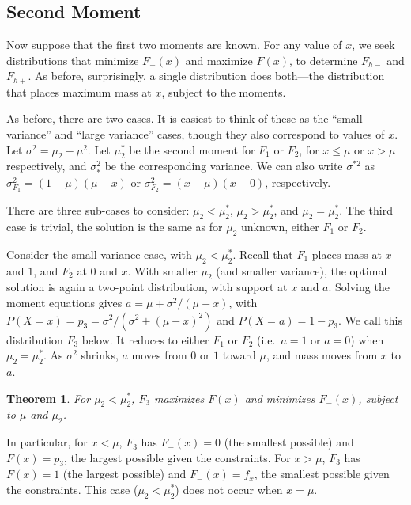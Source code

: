 \documentclass{article}
\newcommand{\Fmin}{F_{h-}}
\newcommand{\Fmax}{F_{h+}}
\newtheorem{theorem}{Theorem}
\begin{document}
\subsection{Second Moment}

Now suppose that the first two moments are known.
For any value of $x$, we seek distributions that minimize
$F_{-}(x)$ and maximize $F(x)$, to determine $\Fmin$ and $\Fmax$.
As before, surprisingly, a single distribution
does both---the distribution that places maximum mass at $x$, subject
to the moments.

As before, there are two cases. It is easiest to
think of these as the ``small variance'' and ``large variance'' cases,
though they also correspond to values of $x$.
Let $\sigma^2 = \mu_2 - \mu^2$.
Let $\mu_2^*$ be the second moment for $F_1$ or $F_2$, for
$x \le \mu$ or $x > \mu$ respectively, and
$\sigma_*^2$ be the corresponding variance.
We can also write $\sigma^{*2}$ as
$\sigma_{F_1}^2 = (1-\mu)(\mu-x)$
or
$\sigma_{F_2}^2 = (x-\mu)(x - 0)$, respectively.


There are three sub-cases to consider:
$\mu_2 < \mu_2^*$,
$\mu_2 > \mu_2^*$, and
$\mu_2 = \mu_2^*$.
The third case is trivial, the solution is the same as for $\mu_2$ unknown,
either $F_1$ or $F_2$.

Consider the small variance case, with $\mu_2 < \mu_2^*$.
Recall that $F_1$ places mass at $x$ and $1$,
and $F_2$ at $0$ and $x$.
With smaller $\mu_2$ (and smaller variance), the optimal solution
is again a two-point distribution,
with support at $x$ and $a$.
Solving the moment equations gives
$a = \mu + \sigma^2/(\mu-x)$,
with $P(X = x) = p_3 = \sigma^2 / (\sigma^2 + (\mu-x)^2)$ and
$P(X = a) = 1-p_3$.
We call this distribution $F_3$ below.
It reduces to either $F_1$ or $F_2$
(i.e.\ $a=1$ or $a=0$) when $\mu_2 = \mu_2^*$.
As $\sigma^2$ shrinks, $a$ moves from $0$ or $1$ toward $\mu$,
and mass moves from $x$ to $a$.

\begin{theorem}
For $\mu_2 < \mu_2^*$,
$F_3$ maximizes $F(x)$ and minimizes $F_{-}(x)$, subject to $\mu$
and $\mu_2$.
\end{theorem}

In particular,
for $x < \mu$, $F_3$
has $F_{-}(x) = 0$ (the smallest possible) and
$F(x) = p_3$, the largest possible given the constraints.
For $x > \mu$, $F_3$
has $F(x) = 1$ (the largest possible) and
$F_{-}(x) = f_x$, the smallest possible given the constraints.
This case ($\mu_2 < \mu_2^*$) does not occur when $x = \mu$.
\end{document}
